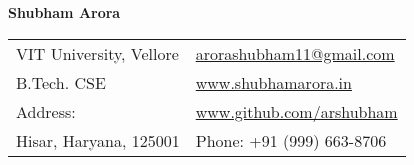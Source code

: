 \documentclass[letterpaper,11pt,oneside]{article}
\begin{document}
\noindent  \LARGE{\textbf{Shubham Arora}}  \\
\vspace{-2ex}
\hline

\normalsize

\begin{center}
\begin{tabular}{l l}
 VIT University, Vellore    & \hspace{1in} \href{mailto:arorashubham11@email.com}{arorashubham11@gmail.com} \\
 B.Tech. CSE    & \hspace{1in}  \href{https://shubhamarora.in}{www.shubhamarora.in}   \\
 Address:            & \hspace{1in} \href{https://github.com/arshubham}{www.github.com/arshubham}  \\
 Hisar, Haryana, 125001 & \hspace{1in} Phone: +91 (999) 663-8706 \\
\end{tabular}
\end{center}

\vspace{1em}
\end{document}
